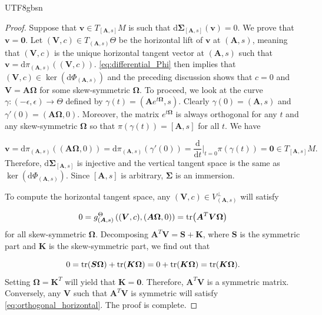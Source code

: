 \documentclass[12pt]{report}
\newcommand{\bracket}[1]{\left ( #1 \right )}
\theoremstyle{plain}
\theoremstyle{definition}
\begin{document}
\begin{CJK*}{UTF8}{gbsn}
\begin{proof}
Suppose that $\bm{v} \in T_{[\bm{A},s]}M$ is 
such that $\mathrm{d} \bm{\Sigma}_{[\bm{A},s]} (\bm{v}) = 0$.
We prove that $\bm{v} = \bm{0}$.
Let $(\bm{V},c) \in T_{(\bm{A},s)}\Theta$ 
be the horizontal lift of $\bm{v}$ at $(\bm{A},s)$,
meaning that $(\bm{V},c)$ is the 
unique horizontal tangent vector at $(\bm{A},s)$
such that
 $\bm{v} = \mathrm{d} \pi_{(\bm{A},s)}((\bm{V},c))$.
\eqref{eq:differential_Phi} then implies that 
$(\bm{V},c) \in \ker(\mathrm{d} \Phi_{(\bm{A},s)})$
and the preceding discussion shows that 
$c = 0$ and $\bm{V} = \bm{A} \bm{\Omega}$ 
for some skew-symmetric $\bm{\Omega}$.
To proceed, 
we look at the 
curve $\gamma: (-\epsilon, \epsilon) \to \Theta$
defined by $\gamma(t) = (\bm{A}e^{t \bm{\Omega}}, s)$.
Clearly $\gamma(0)=(\bm{A}, s)$ and $\gamma'(0) = (\bm{A} \bm{\Omega}, 0)$.
Moreover, the matrix $e^{t \bm{\Omega}}$ is always orthogonal 
for any $t$ and any skew-symmetric $\bm{\Omega}$ 
so that $\pi(\gamma(t)) = [\bm{A},s]$ for all $t$.
We have 

\begin{equation*}
  \bm{v} =
  \mathrm{d} \pi_{(\bm{A},s)}((\bm{A} \bm{\Omega}, 0)) = 
  \mathrm{d} \pi_{(\bm{A},s)} (\gamma'(0)) = \frac{\mathrm{d}}{\mathrm{d} t}
   \bigg|_{t=0} \pi(\gamma(t)) = \bm{0} \in T_{[\bm{A},s]}M.
\end{equation*}
Therefore, $\mathrm{d} \bm{\Sigma}_{[\bm{A},s]}$ is injective and
the vertical tangent space is the same as $\ker(\mathrm{d}\Phi_{(\bm{A},s)})$.
Since $[\bm{A},s]$ is arbitrary, $\bm{\Sigma}$ is an immersion.

To compute the horizontal tangent space, any $(\bm{V}, c) \in V_{(\bm{A},s)}^{\perp}$ 
will satisfy 

\begin{equation}\label{eq:orthogonal_horizontal}
  0 = g_{(\bm{A},s)}^{\Theta} 
  \bracket{(\bm{V}, c), (\bm{A} \bm{\Omega}, 0)} = 
  \tr(\bm{A}^T \bm{V} \bm{\Omega})
\end{equation}
for all skew-symmetric $\bm{\Omega}$.
Decomposing $\bm{A}^T \bm{V} = \bm{S} + \bm{K}$, 
where $\bm{S}$ is the symmetric part and $\bm{K}$ is the skew-symmetric part,
we find out that 

\begin{equation*}
  0 = \tr(\bm{S} \bm{\Omega}) + \tr(\bm{K} \bm{\Omega}) = 0 + \tr(\bm{K} \bm{\Omega}) = \tr(\bm{K} \bm{\Omega}).
\end{equation*}
Setting $\bm{\Omega} = \bm{K}^T$ will yield that $\bm{K} = \bm{0}$.
Therefore, $\bm{A}^T \bm{V}$ is a symmetric matrix.
Conversely, any $\bm{V}$ such that $\bm{A}^T \bm{V}$ is symmetric will satisfy 
\eqref{eq:orthogonal_horizontal}. 
The proof is complete.
\end{proof}


\end{CJK*}
\end{document}
